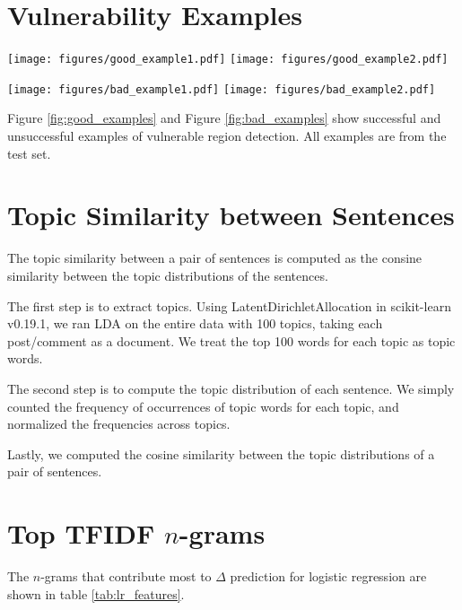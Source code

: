 \documentclass[11pt,a4paper]{article}
\begin{document}
\section{Vulnerability Examples\label{app:vulnerability_examples}}


\begin{figure*}
    \centering
    \texttt{[image: figures/good\_example1.pdf]}
    \texttt{[image: figures/good\_example2.pdf]}
    \caption{Successful examples of vulnerable region detection.\label{fig:good_examples}}
\end{figure*}

\begin{figure*}
    \centering
    \texttt{[image: figures/bad\_example1.pdf]}
    \texttt{[image: figures/bad\_example2.pdf]}
    \caption{Unsuccessful examples of vulnerable region detection.\label{fig:bad_examples}}
\end{figure*}

Figure \ref{fig:good_examples} and Figure \ref{fig:bad_examples} show successful and unsuccessful examples of vulnerable region detection. All examples are from the test set. 

\section{Topic Similarity between Sentences\label{app:topic_similarity}}
The topic similarity between a pair of sentences is computed as the consine similarity between the topic distributions of the sentences. 

The first step is to extract topics. Using \textsf{LatentDirichletAllocation} in \textsf{scikit-learn v0.19.1}, we ran LDA on the entire data with 100 topics, taking each post/comment as a document. We treat the top 100 words for each topic as topic words.

The second step is to compute the topic distribution of each sentence. We simply counted the frequency of occurrences of topic words for each topic, and normalized the frequencies across topics.

Lastly, we computed the cosine similarity between the topic distributions of a pair of sentences.


\section{Top TFIDF $n$-grams\label{app:tfidf}}
The $n$-grams that contribute most to $\Delta$ prediction for logistic regression are shown in table \ref{tab:lr_features}.
\end{document}
